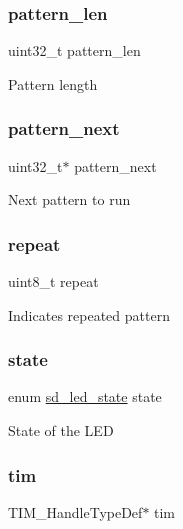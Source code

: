 \subsubsection{\texorpdfstring{pattern\+\_\+len}{pattern\_len}}
{\footnotesize\ttfamily uint32\+\_\+t pattern\+\_\+len}

Pattern length \mbox{\label{structsd__led_aa3c569d89c64771860f259ee403b8f6a}} 
\subsubsection{\texorpdfstring{pattern\+\_\+next}{pattern\_next}}
{\footnotesize\ttfamily uint32\+\_\+t$\ast$ pattern\+\_\+next}

Next pattern to run \mbox{\label{structsd__led_a29642221aad4146341708fe32dfb8064}} 
\subsubsection{\texorpdfstring{repeat}{repeat}}
{\footnotesize\ttfamily uint8\+\_\+t repeat}

Indicates repeated pattern \mbox{\label{structsd__led_ac9669ff49203650ec3bb05c456a4e10a}} 
\subsubsection{\texorpdfstring{state}{state}}
{\footnotesize\ttfamily enum \mbox{\hyperlink{group___s_d___l_e_d___types_ga7daede63a3984f10471c8eb658e936e3}{sd\+\_\+led\+\_\+state}} state}

State of the L\+ED \mbox{\label{structsd__led_a6e46bfc6fae939f8fc5ee53ea4551f18}} 
\subsubsection{\texorpdfstring{tim}{tim}}
{\footnotesize\ttfamily T\+I\+M\+\_\+\+Handle\+Type\+Def$\ast$ tim}

